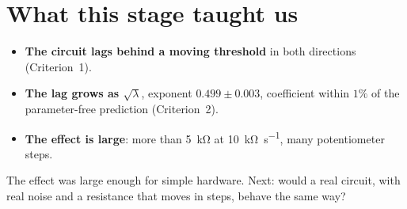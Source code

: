 \section{What this stage taught us}\label{sec:s1-learned}

\begin{learned}
\begin{itemize}[leftmargin=1.2em]
  \item \textbf{The circuit lags behind a moving threshold} in both directions (Criterion~1).
  \item \textbf{The lag grows as $\sqrt{\lambda}$}, exponent $0.499\pm0.003$, coefficient within $1\%$ of
        the parameter-free prediction (Criterion~2).
  \item \textbf{The effect is large}: more than \SI{5}{\kilo\ohm} at \SI{10}{\kilo\ohm\per\second}, many
        potentiometer steps.
\end{itemize}
\end{learned}

The effect was large enough for simple hardware. Next: would a real circuit, with real noise and a
resistance that moves in steps, behave the same way?
